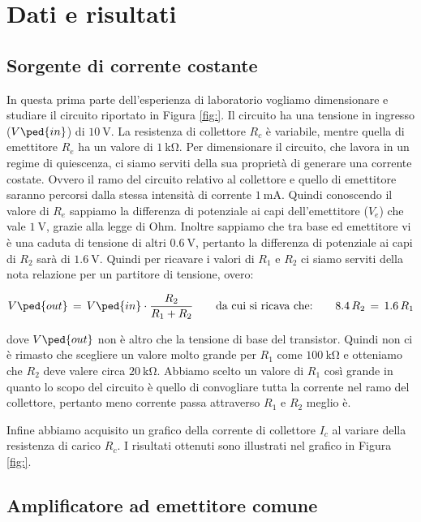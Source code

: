 \section*{Dati e risultati}

\subsection*{Sorgente di corrente costante}

In questa prima parte dell'esperienza di laboratorio vogliamo dimensionare e studiare il circuito riportato in Figura \ref{fig:}. Il circuito ha una tensione in ingresso ($V\ped{in}$) di $\SI{10}{\volt}$. La resistenza di collettore $R_c$ è variabile, mentre quella di emettitore $R_e$ ha un valore di $\SI{1}{\kilo\ohm}$.
Per dimensionare il circuito, che lavora in un regime di quiescenza, ci siamo serviti della sua proprietà di generare una corrente costate. Ovvero il ramo del circuito relativo al collettore e quello di emettitore saranno percorsi dalla stessa intensità di corrente $\SI{1}{\milli\ampere}$. Quindi conoscendo il valore di $R_e$ sappiamo la differenza di potenziale ai capi dell'emettitore ($V_e$) che vale $\SI{1}{\volt}$, grazie alla legge di Ohm. Inoltre sappiamo che tra base ed emettitore vi è una caduta di tensione di altri $\SI{0.6}{\volt}$, pertanto la differenza di potenziale ai capi di $R_2$ sarà di $\SI{1.6}{\volt}$.
Quindi per ricavare i valori di $R_1$ e $R_2$ ci siamo serviti della nota relazione per un partitore di tensione, overo:

\begin{equation}
	V\ped{out} \,=\, V\ped{in}\cdot\frac{R_2}{R_1+R_2} \qquad\text{da cui si ricava che:}\qquad 8.4\,R_2\,=\,1.6\,R_1
\end{equation}

dove $V\ped{out}$ non è altro che la tensione di base del transistor.
Quindi non ci è rimasto che scegliere un valore molto grande per $R_1$ come $\SI{100}{\kilo\ohm}$ e otteniamo che $R_2$ deve valere circa $\SI{20}{\kilo\ohm}$. Abbiamo scelto un valore di $R_1$ così grande in quanto lo scopo del circuito è quello di convogliare tutta la corrente nel ramo del collettore, pertanto meno corrente passa attraverso $R_1$ e $R_2$ meglio è.

Infine abbiamo acquisito un grafico della corrente di collettore $I_c$ al variare della resistenza di carico $R_c$. I risultati ottenuti sono illustrati nel grafico in Figura \ref{fig:}.

\subsection*{Amplificatore ad emettitore comune}

